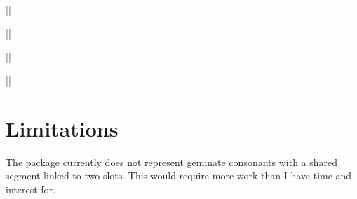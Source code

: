 \documentclass[11pt]{article}
\begin{document}
\begin{multicols}{2}
||


||

\end{multicols}
\clearpage
\begin{multicols}{2}

||


||

\end{multicols}

\section{Limitations}
The package currently does not represent geminate consonants with a shared segment linked to two slots.  This would require more work than I have time and interest for.
\end{document}
